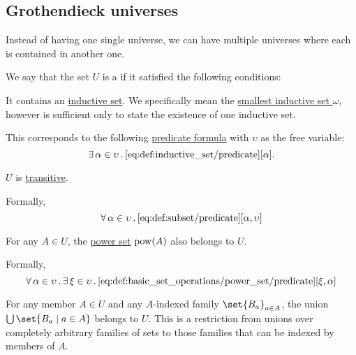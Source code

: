 \subsection{Grothendieck universes}\label{subsec:grothendieck_universes}

Instead of having one single universe, we can have multiple universes where each is contained in another one.

\begin{definition}\label{def:grothendieck_universe}
  We say that the set \( U \) is a  if it satisfied the following conditions:
  \begin{thmenum}
     It contains an \hyperref[def:inductive_set]{inductive set}. We specifically mean the \hyperref[thm:smallest_inductive_set_existence]{smallest inductive set \( \omega \)}, however is sufficient only to state the existence of one inductive set.

    This corresponds to the following \hyperref[rem:predicate_formula]{predicate formula} with \( \upsilon \) as the free variable:
    \begin{equation}\label{eq:def:grothendieck_universe/inductive}
      \exists \thinspace \alpha \in \upsilon \thinspace . \thinspace \ref{eq:def:inductive_set/predicate}[\alpha].
    \end{equation}

     \( U \) is \hyperref[def:transitive_set]{transitive}.

    Formally,
    \begin{equation}\label{eq:def:grothendieck_universe/transitive}
      \forall \thinspace \alpha \in \upsilon \thinspace . \thinspace \ref{eq:def:subset/predicate}[\alpha, \upsilon]
    \end{equation}

     For any \( A \in U \), the \hyperref[def:basic_set_operations/power_set]{power set} \( \operatorname{pow}(A) \) also belongs to \( U \).

    Formally,
    \begin{equation}\label{eq:def:grothendieck_universe/power_set}
      \forall \thinspace \alpha \in \upsilon \thinspace . \thinspace \exists \thinspace \xi \in \upsilon \thinspace . \thinspace \ref{eq:def:basic_set_operations/power_set/predicate}[\xi, \alpha]
    \end{equation}

     For any member \( A \in U \) and any \( A \)-indexed family \( \set{ B_a }_{a \in A} \), the union \( \bigcup\set{ B_a \given a \in A } \) belongs to \( U \). This is a restriction from unions over completely arbitrary families of sets to those families that can be indexed by members of \( A \).


\end{thmenum}
\end{definition}
